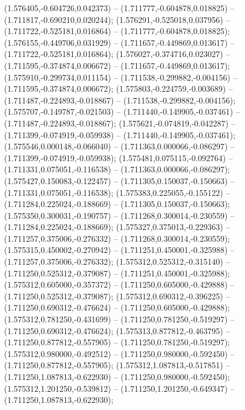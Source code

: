 (1.576405,-0.604726,0.042373) -- (1.711777,-0.604878,0.018825) -- (1.711817,-0.690210,0.020244);
 (1.576291,-0.525018,0.037956) -- (1.711722,-0.525181,0.016864) -- (1.711777,-0.604878,0.018825);
 (1.576155,-0.449706,0.031929) -- (1.711657,-0.449869,0.013617) -- (1.711722,-0.525181,0.016864);
 (1.576027,-0.374716,0.023027) -- (1.711595,-0.374874,0.006672) -- (1.711657,-0.449869,0.013617);
 (1.575910,-0.299734,0.011154) -- (1.711538,-0.299882,-0.004156) -- (1.711595,-0.374874,0.006672);
 (1.575803,-0.224759,-0.003689) -- (1.711487,-0.224893,-0.018867) -- (1.711538,-0.299882,-0.004156);
 (1.575707,-0.149787,-0.021503) -- (1.711440,-0.149905,-0.037461) -- (1.711487,-0.224893,-0.018867);
 (1.575621,-0.074819,-0.042287) -- (1.711399,-0.074919,-0.059938) -- (1.711440,-0.149905,-0.037461);
 (1.575546,0.000148,-0.066040) -- (1.711363,0.000066,-0.086297) -- (1.711399,-0.074919,-0.059938);
 (1.575481,0.075115,-0.092764) -- (1.711331,0.075051,-0.116538) -- (1.711363,0.000066,-0.086297);
 (1.575427,0.150083,-0.122457) -- (1.711305,0.150037,-0.150663) -- (1.711331,0.075051,-0.116538);
 (1.575383,0.225055,-0.155122) -- (1.711284,0.225024,-0.188669) -- (1.711305,0.150037,-0.150663);
 (1.575350,0.300031,-0.190757) -- (1.711268,0.300014,-0.230559) -- (1.711284,0.225024,-0.188669);
 (1.575327,0.375013,-0.229363) -- (1.711257,0.375006,-0.276332) -- (1.711268,0.300014,-0.230559);
 (1.575315,0.450002,-0.270942) -- (1.711251,0.450001,-0.325988) -- (1.711257,0.375006,-0.276332);
 (1.575312,0.525312,-0.315140) -- (1.711250,0.525312,-0.379087) -- (1.711251,0.450001,-0.325988);
 (1.575312,0.605000,-0.357372) -- (1.711250,0.605000,-0.429888) -- (1.711250,0.525312,-0.379087);
 (1.575312,0.690312,-0.396225) -- (1.711250,0.690312,-0.476624) -- (1.711250,0.605000,-0.429888);
 (1.575312,0.781250,-0.431699) -- (1.711250,0.781250,-0.519297) -- (1.711250,0.690312,-0.476624);
 (1.575313,0.877812,-0.463795) -- (1.711250,0.877812,-0.557905) -- (1.711250,0.781250,-0.519297);
 (1.575312,0.980000,-0.492512) -- (1.711250,0.980000,-0.592450) -- (1.711250,0.877812,-0.557905);
 (1.575312,1.087813,-0.517851) -- (1.711250,1.087813,-0.622930) -- (1.711250,0.980000,-0.592450);
 (1.575312,1.201250,-0.539812) -- (1.711250,1.201250,-0.649347) -- (1.711250,1.087813,-0.622930);
